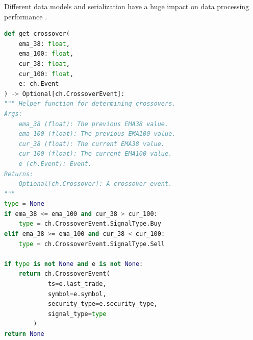 Different data models and serialization have a huge impact on data processing performance \cite{DBLP:conf/cloud/SikdarTJ17}. 





\begin{minipage}{0.9\linewidth}
\begin{lstlisting}[caption={Query 2}, label={lst:createDataFrame4},language=Python]
def get_crossover(
    ema_38: float,
    ema_100: float,
    cur_38: float,
    cur_100: float,
    e: ch.Event
) -> Optional[ch.CrossoverEvent]:
""" Helper function for determining crossovers.
Args:
    ema_38 (float): The previous EMA38 value.
    ema_100 (float): The previous EMA100 value.
    cur_38 (float): The current EMA38 value.
    cur_100 (float): The current EMA100 value.
    e (ch.Event): Event.
Returns:
    Optional[ch.Crossover]: A crossover event.
"""
type = None
if ema_38 <= ema_100 and cur_38 > cur_100:
    type = ch.CrossoverEvent.SignalType.Buy
elif ema_38 >= ema_100 and cur_38 < cur_100:
    type = ch.CrossoverEvent.SignalType.Sell

if type is not None and e is not None:
    return ch.CrossoverEvent(
            ts=e.last_trade,
            symbol=e.symbol,
            security_type=e.security_type,
            signal_type=type
        )    
return None
\end{lstlisting}
\end{minipage}





